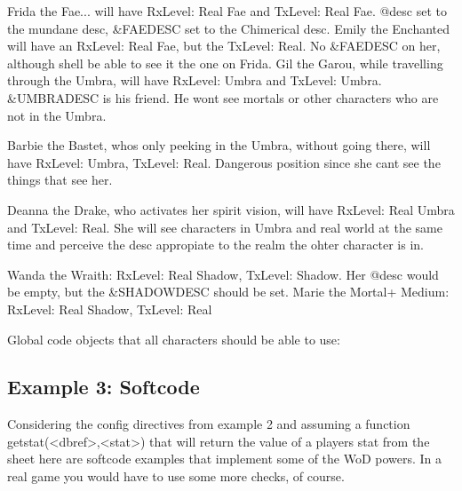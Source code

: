 \documentclass[letterpaper,10pt,english]{sphinxmanual}
\begin{document}
\sphinxAtStartPar
Frida the Fae... will have RxLevel: Real Fae and TxLevel: Real Fae. @desc
set to the mundane desc, \&FAEDESC set to the Chimerical desc.
Emily the Enchanted will have an RxLevel: Real Fae, but the TxLevel: Real.
No \&FAEDESC on her, although she\textquotesingle{}ll be able to see it the one on Frida.
Gil the Garou, while travelling through the Umbra, will have RxLevel: Umbra
and TxLevel: Umbra. \&UMBRADESC is his friend. He won\textquotesingle{}t see mortals or other
characters who are not in the Umbra.

\sphinxAtStartPar
Barbie the Bastet, who\textquotesingle{}s only peeking in the Umbra, without going there,
will have RxLevel: Umbra, TxLevel: Real. Dangerous position since she
can\textquotesingle{}t see the things that see her.

\sphinxAtStartPar
Deanna the Drake, who activates her spirit vision, will have
RxLevel: Real Umbra and TxLevel: Real. She will see characters in Umbra and
real world at the same time and perceive the desc appropiate to the realm
the ohter character is in.

\sphinxAtStartPar
Wanda the Wraith: RxLevel: Real Shadow, TxLevel: Shadow. Her @desc
would be empty, but the \&SHADOWDESC should be set.
Marie the Mortal+ Medium: RxLevel: Real Shadow, TxLevel: Real

\sphinxAtStartPar
Global code objects that all characters should be able to use:

\begin{sphinxVerbatim}[commandchars=\\\{\}]
   
\end{sphinxVerbatim}


\subsection{Example 3: Softcode}
\label{\detokenize{advanced:example-3-softcode}}
\sphinxAtStartPar
Considering the config directives from example 2 and assuming a function
getstat(\textless{}dbref\textgreater{},\textless{}stat\textgreater{}) that will return the value of a player\textquotesingle{}s stat from
the sheet here are softcode examples that implement some of the WoD powers.
In a real game you would have to use some more checks, of course.
\end{document}
